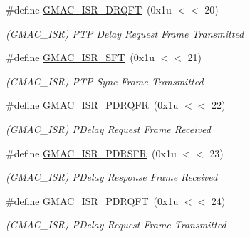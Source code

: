 \begin{DoxyCompactItemize}
\mbox{\label{group__SAMV71__GMAC_ga72aa98c9908c8fee8c02679b7b3f5262}} 
\#define \mbox{\hyperlink{group__SAMV71__GMAC_ga72aa98c9908c8fee8c02679b7b3f5262}{G\+M\+A\+C\+\_\+\+I\+S\+R\+\_\+\+D\+R\+Q\+FT}}~(0x1u $<$$<$ 20)
\begin{DoxyCompactList}\small\item\em (G\+M\+A\+C\+\_\+\+I\+SR) P\+TP Delay Request Frame Transmitted \end{DoxyCompactList}\item 
\mbox{\label{group__SAMV71__GMAC_gae7d51caf15513ee214a14ba37748199e}} 
\#define \mbox{\hyperlink{group__SAMV71__GMAC_gae7d51caf15513ee214a14ba37748199e}{G\+M\+A\+C\+\_\+\+I\+S\+R\+\_\+\+S\+FT}}~(0x1u $<$$<$ 21)
\begin{DoxyCompactList}\small\item\em (G\+M\+A\+C\+\_\+\+I\+SR) P\+TP Sync Frame Transmitted \end{DoxyCompactList}\item 
\mbox{\label{group__SAMV71__GMAC_gab0db5e6e685099758670df64e457c2b3}} 
\#define \mbox{\hyperlink{group__SAMV71__GMAC_gab0db5e6e685099758670df64e457c2b3}{G\+M\+A\+C\+\_\+\+I\+S\+R\+\_\+\+P\+D\+R\+Q\+FR}}~(0x1u $<$$<$ 22)
\begin{DoxyCompactList}\small\item\em (G\+M\+A\+C\+\_\+\+I\+SR) P\+Delay Request Frame Received \end{DoxyCompactList}\item 
\mbox{\label{group__SAMV71__GMAC_gac93e3450831a6861dd32ce882d30a61a}} 
\#define \mbox{\hyperlink{group__SAMV71__GMAC_gac93e3450831a6861dd32ce882d30a61a}{G\+M\+A\+C\+\_\+\+I\+S\+R\+\_\+\+P\+D\+R\+S\+FR}}~(0x1u $<$$<$ 23)
\begin{DoxyCompactList}\small\item\em (G\+M\+A\+C\+\_\+\+I\+SR) P\+Delay Response Frame Received \end{DoxyCompactList}\item 
\mbox{\label{group__SAMV71__GMAC_ga210babaa9a95b880413117cef1b29885}} 
\#define \mbox{\hyperlink{group__SAMV71__GMAC_ga210babaa9a95b880413117cef1b29885}{G\+M\+A\+C\+\_\+\+I\+S\+R\+\_\+\+P\+D\+R\+Q\+FT}}~(0x1u $<$$<$ 24)
\begin{DoxyCompactList}\small\item\em (G\+M\+A\+C\+\_\+\+I\+SR) P\+Delay Request Frame Transmitted \end{DoxyCompactList}\item 
$$
\end{DoxyCompactItemize}
